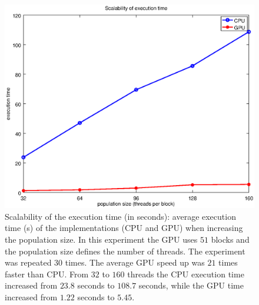 \documentclass[conference]{IEEEtran}
\begin{document}
    \begin{figure}[!htb]
        \centering
        \includegraphics[width=\columnwidth]{../img/scalability_schafferf7_time.eps}
        \caption{Scalability of the execution time (in seconds): average execution time (s) of the implementations (CPU and GPU) when increasing the population size. In this experiment the GPU uses $51$ blocks and the population size defines the number of threads. The experiment was repeated $30$ times. The average GPU speed up was $21$ times faster than CPU. From $32$ to $160$  threads the CPU execution time increased from $23.8$ seconds to $108.7$ seconds, while the GPU time increased from $1.22$ seconds to $5.45$.}
        \label{fig:scalability_schafferf7_time}
    \end{figure}
\end{document}

